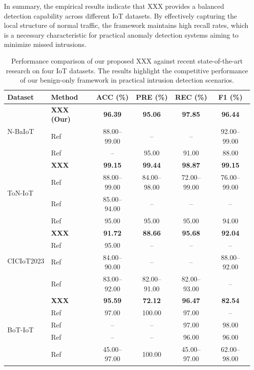\documentclass[final,twocolumn,10pt]{elsarticle}
\begin{document}
In summary, the empirical results indicate that XXX provides a balanced detection capability across different IoT datasets. By effectively capturing the local structure of normal traffic, the framework maintains high recall rates, which is a necessary characteristic for practical anomaly detection systems aiming to minimize missed intrusions.

\begin{table}[t]
\caption{Performance comparison of our proposed XXX against recent state-of-the-art research on four IoT datasets. The results highlight the competitive performance of our benign-only framework in practical intrusion detection scenarios.}
\centering
\small
\setlength{\tabcolsep}{10pt} %
\begin{tabular}{llcccc}
\toprule
\textbf{Dataset} & \textbf{Method} & \textbf{ACC (\%)} & \textbf{PRE (\%)} & \textbf{REC (\%)} & \textbf{F1 (\%)} \\
\midrule
\multirow{3}{*}{N-BaIoT} & \textbf{XXX (Our)} & \textbf{96.39} & \textbf{95.06} & \textbf{97.85} & \textbf{96.44} \\
& Ref \cite{golestani2024device} & 88.00--99.00 & -- & -- & 92.00--99.00 \\
& Ref \cite{10839389} & -- & 95.00 & 91.00 & 88.00 \\
\midrule
\multirow{4}{*}{ToN-IoT} & \textbf{XXX} & \textbf{99.15} & \textbf{99.44} & \textbf{98.87} & \textbf{99.15} \\
& Ref \cite{aktar2024robust} & 88.00--99.00 & 84.00--98.00 & 72.00--99.00 & 76.00--99.00 \\
& Ref \cite{karthikeyan2024firefly} & 85.00--94.00 & -- & -- & -- \\
& Ref \cite{saiyed2024genetic} & 95.00 & 95.00 & 95.00 & 94.00 \\
\midrule
\multirow{4}{*}{CICIoT2023} & \textbf{XXX} & \textbf{91.72} & \textbf{88.66} & \textbf{95.68} & \textbf{92.04} \\
& Ref \cite{parfenov2024investigation} & 95.00 & -- & -- & -- \\
& Ref \cite{golestani2024device} & 84.00--90.00 & -- & -- & 88.00--92.00 \\
& Ref \cite{phan2024comparison} & 83.00--92.00 & 82.00--91.00 & 82.00--93.00 & -- \\
\midrule
\multirow{5}{*}{BoT-IoT} & \textbf{XXX} & \textbf{95.59} & \textbf{72.12} & \textbf{96.47} & \textbf{82.54} \\
& Ref \cite{koroniotis2019towards} & 97.00 & 100.00 & 97.00 & -- \\
& Ref \cite{segurola2024unsupervised} & -- & -- & 97.00 & 98.00 \\
& Ref \cite{9993869} & -- & -- & 96.00 & 96.00 \\
& Ref \cite{golestani2024exploring} & 45.00--97.00 & 100.00 & 45.00--97.00 & 62.00--98.00 \\
\bottomrule
\end{tabular}
\label{tab:ids_comparison}
\end{table}
\end{document}
